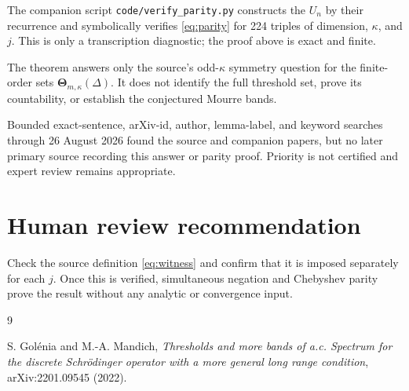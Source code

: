 \documentclass[10pt]{article}
\newcommand{\ThetaSet}{\boldsymbol{\Theta}}
\begin{document}
The companion script \texttt{code/verify\_parity.py} constructs the $U_n$ by
their recurrence and symbolically verifies \eqref{eq:parity} for 224 triples
of dimension, $\kappa$, and $j$.  This is only a transcription diagnostic;
the proof above is exact and finite.

The theorem answers only the source's odd-$\kappa$ symmetry question for the
finite-order sets $\ThetaSet_{m,\kappa}(\Delta)$.  It does not identify the
full threshold set, prove its countability, or establish the conjectured
Mourre bands.

Bounded exact-sentence, arXiv-id, author, lemma-label, and keyword searches
through 26 August 2026 found the source and companion papers, but no later
primary source recording this answer or parity proof.  Priority is not
certified and expert review remains appropriate.

\section{Human review recommendation}

Check the source definition \eqref{eq:witness} and confirm that it is imposed
separately for each $j$.  Once this is verified, simultaneous negation and
Chebyshev parity prove the result without any analytic or convergence input.

\sloppy
\begin{thebibliography}{9}
\raggedright
{}
S. Gol\'{e}nia and M.-A. Mandich,
\emph{Thresholds and more bands of a.c. Spectrum for the discrete
Schr\"odinger operator with a more general long range condition},
arXiv:2201.09545 (2022).
\end{thebibliography}
\end{document}
